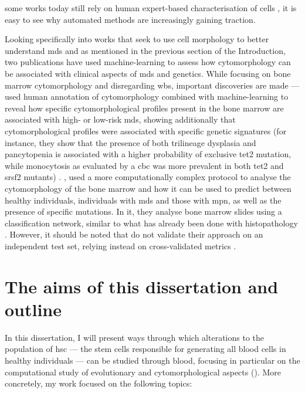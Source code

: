 some works today still rely on human expert-based characterisation of cells \cite{Nagata2020-lh}, it is easy to see why automated methods are increasingly gaining traction.

Looking specifically into works that seek to use cell morphology to better understand \ac{mds} and as mentioned in the previous section of the Introduction, two publications have used machine-learning to assess how cytomorphology can be associated with clinical aspects of \ac{mds} and genetics. While focusing on bone marrow cytomorphology and disregarding \ac{wbs}, important discoveries are made ---  used human annotation of cytomorphology combined with machine-learning to reveal how specific cytomorphological profiles present in the bone marrow are associated with high- or low-risk \ac{mds}, showing additionally that cytomorphological profiles were associated with specific genetic signatures (for instance, they show that the presence of both trilineage dysplasia and pancytopenia is associated with a higher probability of exclusive \ac{tet2} mutation, while monocytosis as evaluated by a \ac{cbc} was more prevalent in both \ac{tet2} and \ac{srsf2} mutants) \cite{Nagata2020-lh}. , used a more computationally complex protocol to analyse the cytomorphology of the bone marrow and how it can be used to predict between healthy individuals, individuals with \ac{mds} and those with \ac{mpn}, as well as the presence of specific mutations. In it, they analyse bone marrow slides using a classification network, similar to what has already been done with histopathology \cite{Fu2020-mx}. However, it should be noted that  do not validate their approach on an independent test set, relying instead on cross-validated metrics \cite{Bruck2021-fx}. 

\section{The aims of this dissertation and outline}

In this dissertation, I will present ways through which alterations to the population of \ac{hsc} --- the stem cells responsible for generating all blood cells in healthy individuals --- can be studied through blood, focusing in particular on the computational study of evolutionary and cytomorphological aspects (). More concretely, my work focused on the following topics:

